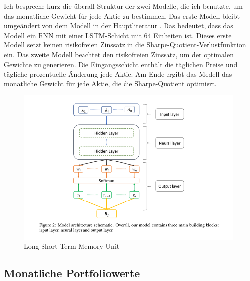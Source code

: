 \documentclass[12pt]{article}
\begin{document}
            Ich bespreche kurz die überall Struktur der zwei Modelle, die ich benutzte, 
            um das monatliche Gewicht für jede Aktie zu bestimmen. 
            Das erste Modell bleibt umgeändert von dem Modell in der Hauptliteratur \cite{zhang2020}. 
            Das bedeutet, dass das Modell ein RNN mit einer LSTM-Schicht mit 64 Einheiten ist. 
            Dieses erste Modell setzt keinen risikofreien Zinssatz in die Sharpe-Quotient-Verlustfunktion ein. 
            Das zweite Modell beachtet den risikofreien Zinssatz, um der optimalen Gewichte zu generieren. 
            Die Eingangsschicht enthält die täglichen Preise und tägliche prozentuelle Änderung jede Aktie. 
            Am Ende ergibt das Modell das monatliche Gewicht für jede Aktie, die die Sharpe-Quotient optimiert.

            \begin{figure}[ht]
            
                \begin{center}

                    \includegraphics[scale=1]{zhang-knn.png}
                    \caption{Long Short-Term Memory Unit \cite{zhang2020}}
        
                \end{center}
                
            \end{figure}

        \subsection{Monatliche Portfoliowerte}
\end{document}
